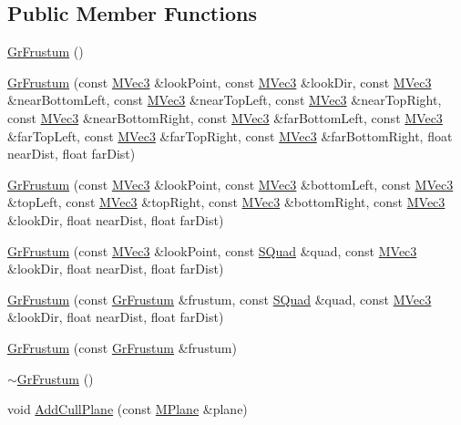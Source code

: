 \begin{CompactItemize}
\subsection*{Public Member Functions}
\begin{CompactItemize}
\item 
\hyperlink{class_gr_frustum_41a338ecbcb9de65c9bce33b89b744bf}{GrFrustum} ()
\item 
\hyperlink{class_gr_frustum_4b37b98bc82214e96112a0c058ce8b54}{GrFrustum} (const \hyperlink{class_m_vec3}{MVec3} \&lookPoint, const \hyperlink{class_m_vec3}{MVec3} \&lookDir, const \hyperlink{class_m_vec3}{MVec3} \&nearBottomLeft, const \hyperlink{class_m_vec3}{MVec3} \&nearTopLeft, const \hyperlink{class_m_vec3}{MVec3} \&nearTopRight, const \hyperlink{class_m_vec3}{MVec3} \&nearBottomRight, const \hyperlink{class_m_vec3}{MVec3} \&farBottomLeft, const \hyperlink{class_m_vec3}{MVec3} \&farTopLeft, const \hyperlink{class_m_vec3}{MVec3} \&farTopRight, const \hyperlink{class_m_vec3}{MVec3} \&farBottomRight, float nearDist, float farDist)
\item 
\hyperlink{class_gr_frustum_f2db0fbb9b5c715759d5bd2da6dcb601}{GrFrustum} (const \hyperlink{class_m_vec3}{MVec3} \&lookPoint, const \hyperlink{class_m_vec3}{MVec3} \&bottomLeft, const \hyperlink{class_m_vec3}{MVec3} \&topLeft, const \hyperlink{class_m_vec3}{MVec3} \&topRight, const \hyperlink{class_m_vec3}{MVec3} \&bottomRight, const \hyperlink{class_m_vec3}{MVec3} \&lookDir, float nearDist, float farDist)
\item 
\hyperlink{class_gr_frustum_7b9113897c06cf6ab0fcdc24d47bcde2}{GrFrustum} (const \hyperlink{class_m_vec3}{MVec3} \&lookPoint, const \hyperlink{struct_s_quad}{SQuad} \&quad, const \hyperlink{class_m_vec3}{MVec3} \&lookDir, float nearDist, float farDist)
\item 
\hyperlink{class_gr_frustum_b5fc97ae84eef3b86eab19def346ebfc}{GrFrustum} (const \hyperlink{class_gr_frustum}{GrFrustum} \&frustum, const \hyperlink{struct_s_quad}{SQuad} \&quad, const \hyperlink{class_m_vec3}{MVec3} \&lookDir, float nearDist, float farDist)
\item 
\hyperlink{class_gr_frustum_d60e52630e16a9d3353027d2d8d21027}{GrFrustum} (const \hyperlink{class_gr_frustum}{GrFrustum} \&frustum)
\item 
\hyperlink{class_gr_frustum_c8740aef3cdcf16db377bc346ec2ac75}{$\sim$GrFrustum} ()
\item 
void \hyperlink{class_gr_frustum_c711031f75c591aa9810cff76178e8b1}{AddCullPlane} (const \hyperlink{class_m_plane}{MPlane} \&plane)

\end{CompactItemize}
\end{CompactItemize}
